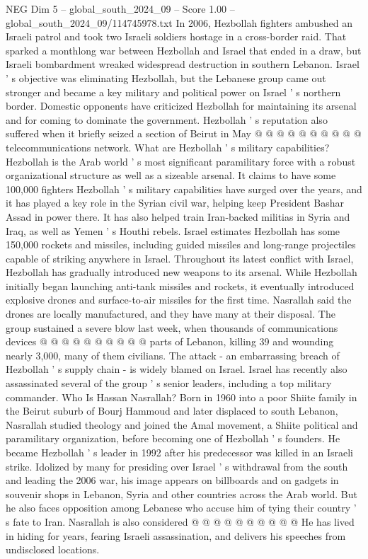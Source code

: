\begin{textsample}{NEG Dim 5 – global\_south\_2024\_09 – Score 1.00 – global\_south\_2024\_09/114745978.txt}
In 2006, Hezbollah fighters ambushed an Israeli patrol and took two Israeli soldiers hostage in a cross-border raid.
That sparked a monthlong war between Hezbollah and Israel that ended in a draw, but Israeli bombardment wreaked widespread destruction in southern Lebanon.
Israel ' s objective was eliminating Hezbollah, but the Lebanese group came out stronger and became a key military and political power on Israel ' s northern border.
Domestic opponents have criticized Hezbollah for maintaining its arsenal and for coming to dominate the government.
Hezbollah ' s reputation also suffered when it briefly seized a section of Beirut in May @ @ @ @ @ @ @ @ @ @ telecommunications network.
What are Hezbollah ' s military capabilities?
Hezbollah is the Arab world ' s most significant paramilitary force with a robust organizational structure as well as a sizeable arsenal.
It claims to have some 100,000 fighters Hezbollah ' s military capabilities have surged over the years, and it has played a key role in the Syrian civil war, helping keep President Bashar Assad in power there.
It has also helped train Iran-backed militias in Syria and Iraq, as well as Yemen ' s Houthi rebels.
Israel estimates Hezbollah has some 150,000 rockets and missiles, including guided missiles and long-range projectiles capable of striking anywhere in Israel.
Throughout its latest conflict with Israel, Hezbollah has gradually introduced new weapons to its arsenal.
While Hezbollah initially began launching anti-tank missiles and rockets, it eventually introduced explosive drones and surface-to-air missiles for the first time.
Nasrallah said the drones are locally manufactured, and they have many at their disposal.
The group sustained a severe blow last week, when thousands of communications devices @ @ @ @ @ @ @ @ @ @ parts of Lebanon, killing 39 and wounding nearly 3,000, many of them civilians.
The attack - an embarrassing breach of Hezbollah ' s supply chain - is widely blamed on Israel.
Israel has recently also assassinated several of the group ' s senior leaders, including a top military commander.
Who Is Hassan Nasrallah?
Born in 1960 into a poor Shiite family in the Beirut suburb of Bourj Hammoud and later displaced to south Lebanon, Nasrallah studied theology and joined the Amal movement, a Shiite political and paramilitary organization, before becoming one of Hezbollah ' s founders.
He became Hezbollah ' s leader in 1992 after his predecessor was killed in an Israeli strike.
Idolized by many for presiding over Israel ' s withdrawal from the south and leading the 2006 war, his image appears on billboards and on gadgets in souvenir shops in Lebanon, Syria and other countries across the Arab world.
But he also faces opposition among Lebanese who accuse him of tying their country ' s fate to Iran.
Nasrallah is also considered @ @ @ @ @ @ @ @ @ @ He has lived in hiding for years, fearing Israeli assassination, and delivers his speeches from undisclosed locations.

\end{textsample}
